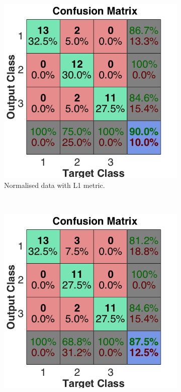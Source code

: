 \documentclass[a4paper, 10pt, conference]{ieeeconf}
\begin{document}
\begin{figure}[!ht]
  \captionsetup[subfigure]{position=b}
  \centering
    \begin{subfigure}{0.32\textwidth}
      \includegraphics[width=\textwidth]{pic/mod_l1.png}
      \caption{Normalised data with L1 metric. }
    \end{subfigure}
    ~
    \begin{subfigure}{0.32\textwidth}
      \includegraphics[width=\textwidth]{pic/mod_l2.png}

\end{subfigure}
\end{figure}
\end{document}
